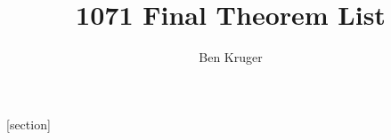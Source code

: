 \newenvironment{corollary}%
{\begin{quote}\textbf{Corollary}:}%
{\end{quote}}

\newenvironment{question}%
{\begin{quote}\textbf{Q}:}%
{\end{quote}}

\newenvironment{remark}%
{\begin{quote}\textbf{Rmk}:}%
{\end{quote}}

\newenvironment{notation}%
{\begin{quote}\textbf{Notation}:}%
{\end{quote}}



\newcommand{\Lim}{\displaystyle\lim}
\newcommand{\integral}{\displaystyle\int}
\sloppy
\title{1071 Final Theorem List}
\author{Ben Kruger}


\newenvironment{prf}[1][]{%
\ifstrempty{#1}%
{\mdfsetup{%
frametitle={%
\tikz[baseline=(current bounding box.east),outer sep=0pt]
\node[anchor=east,rectangle,fill=red!50]
{\strut Proof};}}
}%
{\mdfsetup{%
frametitle={%
\tikz[baseline=(current bounding box.east),outer sep=0pt]
\node[anchor=east,rectangle,fill=red!50]
{\strut Proof:~#1};}}%
}%
\mdfsetup{innertopmargin=10pt,linecolor=red!50,%
linewidth=2pt,topline=true,%
frametitleaboveskip=\dimexpr-\ht\strutbox\relax
}
\begin{mdframed}[]\relax%
}{\qed\end{mdframed}}


[section] \setcounter{deri}{0}
\renewcommand{\thederi}{\arabic{section}.\arabic{deri}}
\newenvironment{derivation}[2][]{%
\refstepcounter{deri}%
\ifstrempty{#1}%
{\mdfsetup{%
frametitle={%
\tikz[baseline=(current bounding box.east),outer sep=0pt]
\node[anchor=east,rectangle,fill=orange!40]
{\strut Derivation~\thederi};}}
}%
{\mdfsetup{%
frametitle={%
\tikz[baseline=(current bounding box.east),outer sep=0pt]
\node[anchor=east,rectangle,fill=orange!40]
{\strut Derivation:~#1};}}%
}%
\mdfsetup{innertopmargin=10pt,linecolor=orange!40,%
linewidth=2pt,topline=true,%
frametitleaboveskip=\dimexpr-\ht\strutbox\relax
}
\begin{mdframed}[]\relax%
\label{#2}}{\end{mdframed}}
